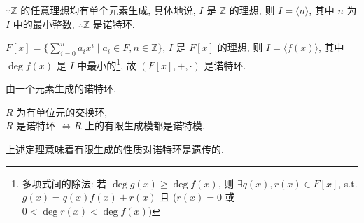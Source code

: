 \documentclass{note}
\begin{document}
\begin{eg}
    $\because\mathbb{Z}$ 的任意理想均有单个元素生成, 具体地说, $I$ 是 $\mathbb{Z}$ 的理想, 则 $I=\langle n\rangle$, 其中 $n$ 为 $I$ 中的最小整数, $\therefore\mathbb{Z}$ 是诺特环.
\end{eg}

\begin{eg}
    $F[x]=\{\sum_{i=0}^na_ix^i\mid a_i\in F,n\in\mathbb{Z}\}$, $I$ 是 $F[x]$ 的理想, 则 $I=\langle f(x)\rangle$, 其中 $\deg f(x)$ 是 $I$ 中最小的\footnote{多项式间的除法: 若 $\deg g(x)\geq\deg f(x)$, 则 $\exists q(x),r(x)\in F[x]$, s.t. $g(x)=q(x)f(x)+r(x)$ 且 ($r(x)=0$ 或 $0<\deg r(x)<\deg f(x)$)}, 故 $(F[x],+,\cdot)$ 是诺特环.
\end{eg}

\begin{df}[主理想]
    由一个元素生成的诺特环.
\end{df}

\begin{thm}[(课本定理 5.8)]\label{thm-5.8}
    $R$ 为有单位元的交换环,\\
    $R$ 是诺特环 $\Longleftrightarrow R$ 上的有限生成模都是诺特模.
\end{thm}

上述定理意味着有限生成的性质对诺特环是遗传的.
\end{document}
